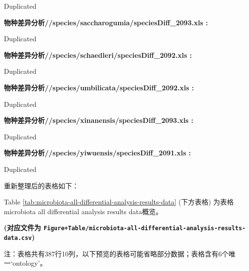 \documentclass[
]{article}
\begin{document}
\begin{center}
\begin{tcolorbox}[colback=gray!10, colframe=gray!50, width=0.9\linewidth, arc=1mm, boxrule=0.5pt]
\vspace{0.5em}

    Duplicated

\vspace{2em}


\textbf{
物种差异分析//species/saccharogumia/speciesDiff\_2093.xls
:}

\vspace{0.5em}

    Duplicated

\vspace{2em}


\textbf{
物种差异分析//species/schaedleri/speciesDiff\_2092.xls
:}

\vspace{0.5em}

    Duplicated

\vspace{2em}


\textbf{
物种差异分析//species/umbilicata/speciesDiff\_2092.xls
:}

\vspace{0.5em}

    Duplicated

\vspace{2em}


\textbf{
物种差异分析//species/xinanensis/speciesDiff\_2093.xls
:}

\vspace{0.5em}

    Duplicated

\vspace{2em}


\textbf{
物种差异分析//species/yiwuensis/speciesDiff\_2091.xls
:}

\vspace{0.5em}

    Duplicated

\vspace{2em}
\end{tcolorbox}
\end{center}

重新整理后的表格如下：

Table \ref{tab:microbiota-all-differential-analysis-results-data} (下方表格) 为表格microbiota all differential analysis results data概览。

\textbf{(对应文件为 \texttt{Figure+Table/microbiota-all-differential-analysis-results-data.csv})}

\begin{center}\begin{tcolorbox}[colback=gray!10, colframe=gray!50, width=0.9\linewidth, arc=1mm, boxrule=0.5pt]注：表格共有387行10列，以下预览的表格可能省略部分数据；表格含有6个唯一`ontology'。
\end{tcolorbox}
\end{center}
\end{document}
